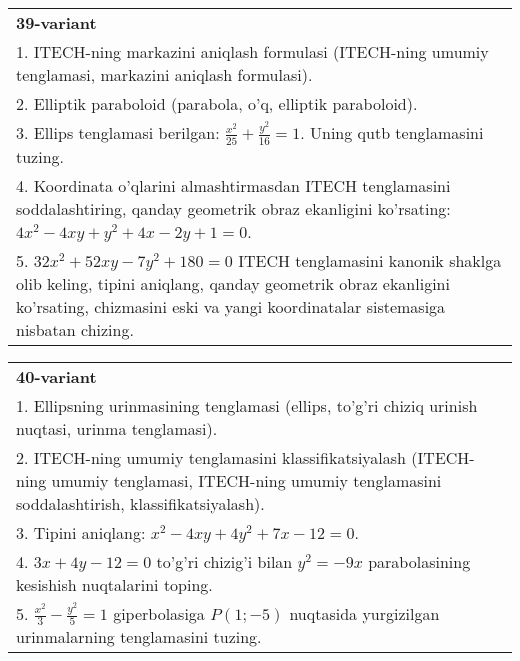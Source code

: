 \documentclass{article}
\begin{document}
\begin{tabular}{m{17cm}}
\textbf{39-variant}\\
1. ITECH-ning markazini aniqlash formulasi (ITECH-ning umumiy tenglamasi, markazini aniqlash formulasi).\\

2. Elliptik paraboloid (parabola, o'q, elliptik paraboloid).\\

3. Ellips tenglamasi berilgan: $\frac{x^2}{25}+\frac{y^2}{16}=1$. Uning qutb tenglamasini tuzing.\\

4. Koordinata o'qlarini almashtirmasdan ITECH tenglamasini soddalashtiring, qanday geometrik obraz ekanligini ko'rsating: $4x^{2} - 4xy + y^{2} + 4x - 2y + 1 = 0$.  \\

5. $32x^{2} + 52xy - 7y^{2} + 180 = 0$ ITECH tenglamasini kanonik shaklga olib keling, tipini aniqlang, qanday geometrik obraz ekanligini ko'rsating, chizmasini eski va yangi koordinatalar sistemasiga nisbatan chizing.  
\end{tabular}
\vspace{1cm}


\begin{tabular}{m{17cm}}
\textbf{40-variant}\\
1. Ellipsning urinmasining tenglamasi (ellips, to'g'ri chiziq urinish nuqtasi, urinma tenglamasi).\\

2. ITECH-ning umumiy tenglamasini klassifikatsiyalash (ITECH-ning umumiy tenglamasi, ITECH-ning umumiy tenglamasini soddalashtirish, klassifikatsiyalash).\\

3. Tipini aniqlang: $x^{2}-4xy+4y^{2}+7x-12=0$.\\

4. $3x + 4y - 12 = 0$ to'g'ri chizig'i bilan $y^{2} = - 9x$ parabolasining kesishish nuqtalarini toping.  \\

5. $\frac{x^{2}}{3} - \frac{y^{2}}{5} = 1$ giperbolasiga $P(1; - 5)$ nuqtasida yurgizilgan urinmalarning tenglamasini tuzing.
\end{tabular}
\vspace{1cm}
\end{document}
